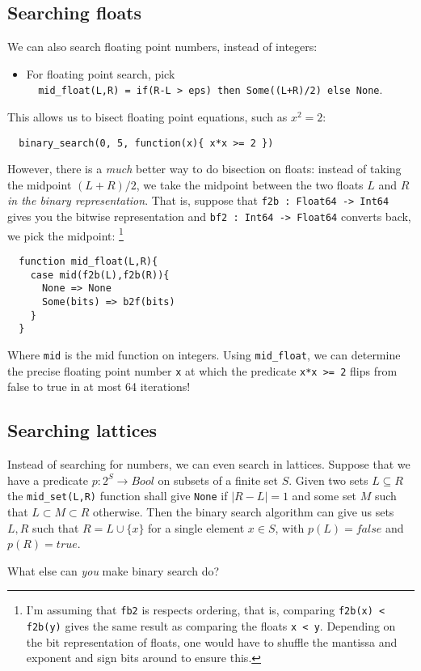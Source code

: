 \documentclass[a4paper, 11pt]{article}
\begin{document}
\subsection{Searching floats}

\noindent We can also search floating point numbers, instead of integers:
\begin{itemize}
  \item For floating point search, pick \\ \lstinline|  mid_float(L,R) = if(R-L > eps) then Some((L+R)/2) else None|.
\end{itemize}

\noindent This allows us to bisect floating point equations, such as $x^2 = 2$:

\begin{lstlisting}
  binary_search(0, 5, function(x){ x*x >= 2 })
\end{lstlisting}

\noindent However, there is a \emph{much} better way to do bisection on floats: instead of taking the midpoint $(L+R)/2$, we take the midpoint between the two floats $L$ and $R$ \emph{in the binary representation}. That is, suppose that \lstinline|f2b : Float64 -> Int64| gives you the bitwise representation and \lstinline|bf2 : Int64 -> Float64| converts back, we pick the midpoint: \footnote{I'm assuming that \lstinline|fb2| is respects ordering, that is, comparing \lstinline|f2b(x) < f2b(y)| gives the same result as comparing the floats \lstinline|x < y|. Depending on the bit representation of floats, one would have to shuffle the mantissa and exponent and sign bits around to ensure this.}

\begin{lstlisting}
  function mid_float(L,R){
    case mid(f2b(L),f2b(R)){
      None => None
      Some(bits) => b2f(bits)
    }
  }
\end{lstlisting}

\noindent Where \lstinline|mid| is the mid function on integers. Using \lstinline|mid_float|, we can determine the precise floating point number \lstinline|x| at which the predicate \lstinline|x*x >= 2| flips from false to true in at most 64 iterations!

\subsection{Searching lattices}

Instead of searching for numbers, we can even search in lattices. Suppose that we have a predicate $p : 2^S \to Bool$ on subsets of a finite set $S$. Given two sets $L \subseteq R$ the \lstinline|mid_set(L,R)| function shall give \lstinline|None| if $|R - L| = 1$ and some set $M$ such that $L \subset M \subset R$ otherwise. Then the binary search algorithm can give us sets $L,R$ such that $R = L \cup \{x\}$ for a single element $x\in S$, with $p(L) = false$ and $p(R) = true$.

\bigskip

What else can \emph{you} make binary search do?
\end{document}
